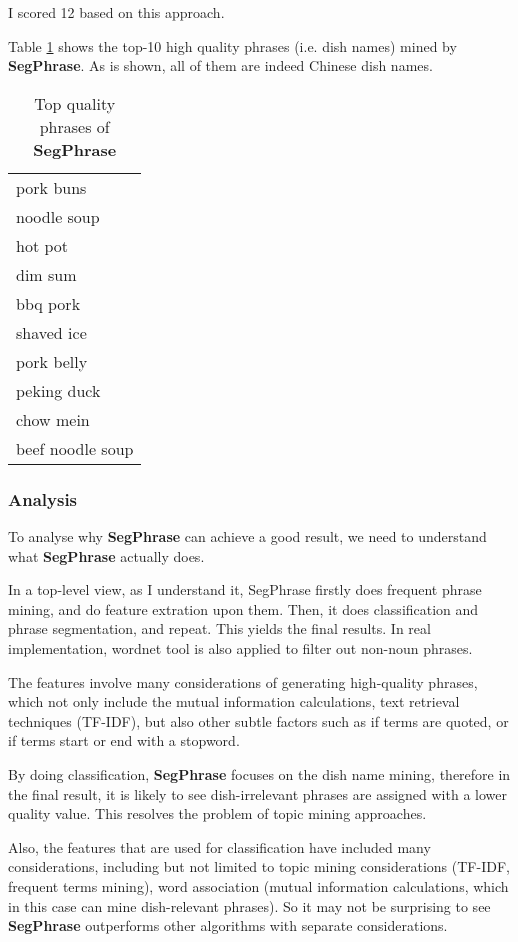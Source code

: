 \documentclass[11pt]{article}
\begin{document}
I scored 12 based on this approach.

Table \ref{tab:segphrase} shows the top-10 high quality phrases (i.e. dish names) mined by \textbf{SegPhrase}. As is shown, all of them are indeed Chinese dish names.
\begin{table}
  \centering
  \begin{tabular}{l}
    \hline
    pork buns \\
    noodle soup \\
    hot pot \\
    dim sum \\
    bbq pork \\
    shaved ice \\
    pork belly \\
    peking duck \\
    chow mein \\
    beef noodle soup \\
    \hline
  \end{tabular}
  \caption{Top quality phrases of \textbf{SegPhrase}}
  \label{tab:segphrase}
\end{table}



\subsubsection{Analysis}
To analyse why \textbf{SegPhrase} can achieve a good result, we need to understand what \textbf{SegPhrase} actually does.

In a top-level view, as I understand it, SegPhrase firstly does frequent phrase mining, and do feature extration upon them. Then, it does classification and phrase segmentation, and repeat. This yields the final results.
In real implementation, wordnet tool is also applied to filter out non-noun phrases.

\vspace{1.5em}
The features involve many considerations of generating high-quality phrases, which not only include the mutual information calculations, text retrieval techniques (TF-IDF), but also other subtle factors such as if terms are quoted, or if terms start or end with a stopword.

By doing classification, \textbf{SegPhrase} focuses on the dish name mining, therefore in the final result, it is likely to see dish-irrelevant phrases are assigned with a lower quality value. This resolves the problem of topic mining approaches.

Also, the features that are used for classification have included many considerations, including but not limited to topic mining considerations (TF-IDF, frequent terms mining), word association (mutual information calculations, which in this case can mine dish-relevant phrases).
So it may not be surprising to see \textbf{SegPhrase} outperforms other algorithms with separate considerations.
\end{document}
